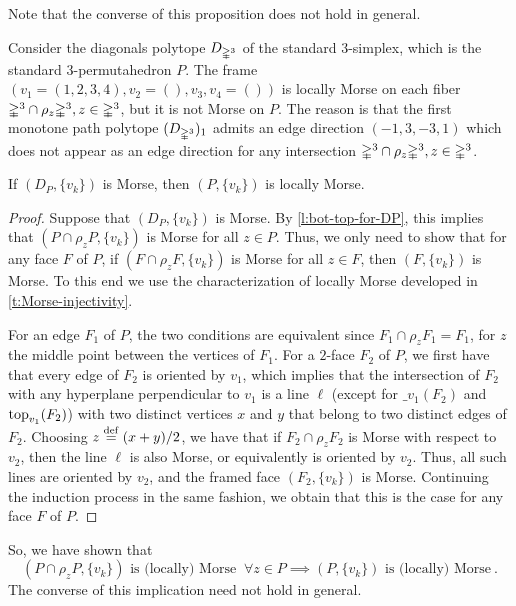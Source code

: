 Note that the converse of this proposition does not hold in general.

\begin{example}
\label{e:simplex-permuto}
	Consider the diagonals polytope $D_{\mathbb{\Delta}^3}$ of the standard $3$-simplex, which is the standard $3$-permutahedron $P$. 
	The frame $(v_1=(1,2,3,4),v_2=(),v_3, v_4=())$ is locally Morse on each fiber $\mathbb{\Delta}^3 \cap \rho_z \mathbb{\Delta}^3, z \in \mathbb{\Delta}^3$, but it is not Morse on $P$. 
	The reason is that the first monotone path polytope $(D_{\mathbb{\Delta}^3})_1$ admits an edge direction $(-1,3,-3,1)$ which does not appear as an edge direction for any intersection $\mathbb{\Delta}^3 \cap \rho_z \mathbb{\Delta}^3, z \in \mathbb{\Delta}^3$. 
\end{example}

\begin{theorem}
	If $(D_P,\{v_k\})$ is Morse, then $(P,\{v_k\})$ is locally Morse.
\end{theorem}

\begin{proof}
	Suppose that $(D_P,\{v_k\})$ is Morse.
	By \cref{l:bot-top-for-DP}, this implies that $(P\cap\rho_z P, \{v_k\})$ is Morse for all $z \in P$.
	Thus, we only need to show that for any face $F$ of $P$, if $(F \cap \rho_z F, \{v_k\})$ is Morse for all $z \in F$, then $(F,\{v_k\})$ is Morse.
	To this end we use the characterization of locally Morse developed in \cref{t:Morse-injectivity}.
	
	For an edge $F_1$ of $P$, the two conditions are equivalent since $F_1 \cap \rho_z F_1 = F_1$, for $z$ the middle point between the vertices of $F_1$.
	For a $2$-face $F_2$ of $P$, we first have that every edge of $F_2$ is oriented by $v_1$, which implies that the intersection of $F_2$ with any hyperplane perpendicular to $v_1$ is a line $\ell$ (except for $\bm_{v_1}(F_2)$ and $\operatorname{top}_{v_1}(F_2)$) with two distinct vertices $x$ and $y$ that belong to two distinct edges of $F_2$.
	Choosing $z \stackrel{\mathrm{def}}{=} (x+y)/2$, we have that if $F_2 \cap \rho_z F_2$ is Morse with respect to $v_2$, then the line $\ell$ is also Morse, or equivalently is oriented by $v_2$.
	Thus, all such lines are oriented by $v_2$, and the framed face $(F_2,\{v_k\})$ is Morse.
	Continuing the induction process in the same fashion, we obtain that this is the case for any face $F$ of $P$.
\end{proof}

So, we have shown that 
\[
	(P\cap \rho_z P,\{v_k\}) \text{ is (locally) Morse }  \ \forall z \in P 
	\implies (P,\{v_k\}) \text{ is (locally) Morse} \ .
\]
The converse of this implication need not hold in general. 

